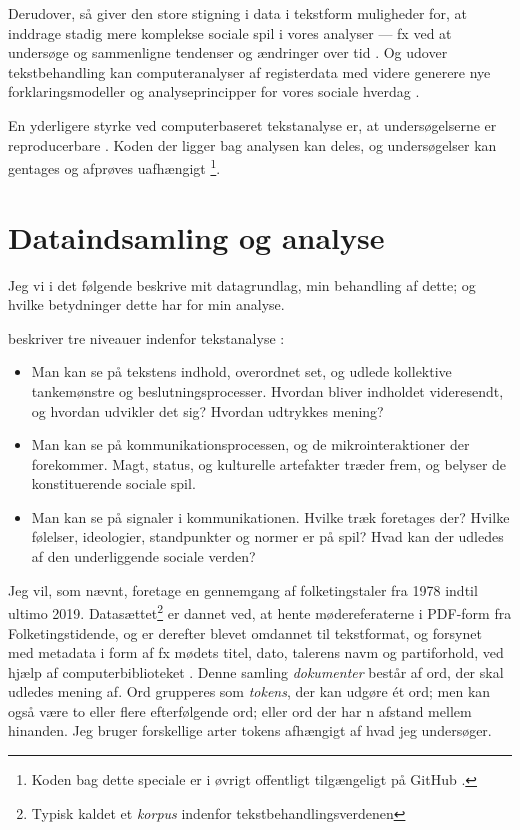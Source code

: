 Derudover, så giver den store stigning i data i tekstform muligheder for, at inddrage stadig mere komplekse sociale spil i vores analyser — fx ved at undersøge og sammenligne tendenser og ændringer over tid \autocite{evansMachineTranslationMining2016}.
Og udover tekstbehandling kan computeranalyser af registerdata med videre generere nye forklaringsmodeller og analyseprincipper for vores sociale hverdag \autocite{evansComputationSociologicalImagination2019}.


En yderligere styrke ved computerbaseret tekstanalyse er, at undersøgelserne er reproducerbare \autocite[s. 13]{kwartlerTextMiningPractice2017}.
Koden der ligger bag analysen kan deles, og undersøgelser kan gentages og afprøves uafhængigt \footnote{Koden bag dette speciale er i øvrigt offentligt tilgængeligt på GitHub \autocite{andersenNorseghostMasterthesis2020}.}.

\chapter{Dataindsamling og analyse}\label{chap:data}

Jeg vi i det følgende beskrive mit datagrundlag, min behandling af dette; og hvilke betydninger dette har for min analyse.

\citeauthor{evansMachineTranslationMining2016} beskriver tre niveauer indenfor tekstanalyse \autocite[s. 34]{evansMachineTranslationMining2016}:
\begin{itemize}
  \item
    Man kan se på tekstens indhold, overordnet set, og udlede kollektive tankemønstre og beslutningsprocesser.
    Hvordan bliver indholdet videresendt, og hvordan udvikler det sig?
    Hvordan udtrykkes mening?
  \item
    Man kan se på kommunikationsprocessen, og de mikrointeraktioner der forekommer.
    Magt, status, og kulturelle artefakter træder frem, og belyser de konstituerende sociale spil.
  \item
    Man kan se på signaler i kommunikationen.
    Hvilke træk foretages der?
    Hvilke følelser, ideologier, standpunkter og normer er på spil?
    Hvad kan der udledes af den underliggende sociale verden?
\end{itemize}

Jeg vil, som nævnt, foretage en gennemgang af folketingstaler fra 1978 indtil ultimo 2019.
Datasættet\footnote{Typisk kaldet et \textit{korpus} indenfor tekstbehandlingsverdenen} er dannet ved, at hente mødereferaterne i PDF-form fra Folketingstidende, og er derefter blevet omdannet til tekstformat, og forsynet med metadata i form af fx mødets titel, dato, talerens navm og partiforhold, ved hjælp af computerbiblioteket  \autocite{pedersenFolketinget2019}.
Denne samling \textit{dokumenter} består af ord, der skal udledes mening af.
Ord grupperes som \textit{tokens}, der kan udgøre ét ord; men kan også være to eller flere efterfølgende ord; eller ord der har n afstand mellem hinanden.
Jeg bruger forskellige arter tokens afhængigt af hvad jeg undersøger.

